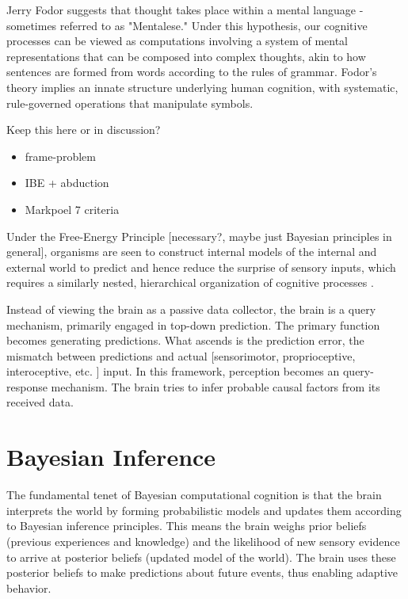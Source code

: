Jerry Fodor suggests that thought takes place within a mental language - sometimes referred to as "Mentalese." Under this hypothesis, our cognitive processes can be viewed as computations involving a system of mental representations that can be composed into complex thoughts, akin to how sentences are formed from words according to the rules of grammar. Fodor's theory implies an innate structure underlying human cognition, with systematic, rule-governed operations that manipulate symbols.


Keep this here or in discussion?
\begin{itemize}
    \item frame-problem
    \item IBE + abduction
    \item Markpoel 7 criteria
\end{itemize}







Under the Free-Energy Principle [necessary?, maybe just Bayesian principles in general], organisms are seen to construct internal models of the internal and external world to predict and hence reduce the surprise of sensory inputs, which requires a similarly nested, hierarchical organization of cognitive processes \cite{friston_free-energy_2010, friston_world_2021}. 

Instead of viewing the brain as a passive data collector, the brain is a query mechanism, primarily engaged in top-down prediction. The primary function becomes generating predictions. What ascends is the prediction error, the mismatch between predictions and actual [sensorimotor, proprioceptive, interoceptive, etc. ] input. In this framework, perception becomes an query-response mechanism. The brain tries to infer probable causal factors from its received data.

\section{Bayesian Inference}

The fundamental tenet of Bayesian computational cognition is that the brain interprets the world by forming probabilistic models and updates them according to Bayesian inference principles. This means the brain weighs prior beliefs (previous experiences and knowledge) and the likelihood of new sensory evidence to arrive at posterior beliefs (updated model of the world). The brain uses these posterior beliefs to make predictions about future events, thus enabling adaptive behavior.

